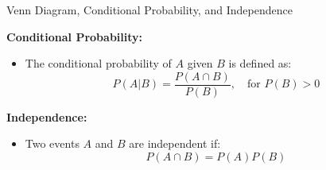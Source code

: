 \documentclass[xcolor=svgnames,t]{beamer}
\begin{document}
\begin{frame}{Venn Diagram, Conditional Probability, and Independence}
  \begin{center}
    
  \end{center}
   

    \vspace{0.3cm}
    
    \textbf{Conditional Probability:}
    \begin{itemize}
      \item The conditional probability of \( A \) given \( B \) is defined as:
      \[
      P(A|B) = \frac{P(A \cap B)}{P(B)}, \quad \text{for } P(B) > 0
      \]
    \end{itemize}
    
    \vspace{0.3cm}

    \textbf{Independence:}
    \begin{itemize}
      \item Two events \( A \) and \( B \) are independent if:
      \[
      P(A \cap B) = P(A)P(B)
      \]
    \end{itemize}
\end{frame}
\end{document}
